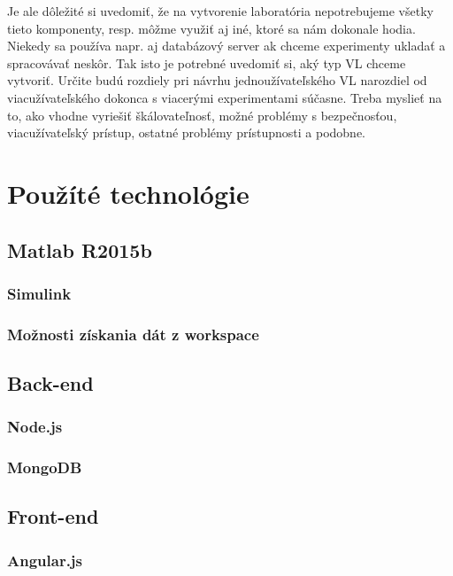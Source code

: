 Je ale dôležité si uvedomiť, že na vytvorenie laboratória nepotrebujeme všetky tieto komponenty, resp. môžme využiť aj iné, ktoré sa nám dokonale hodia. Niekedy sa používa napr. aj databázový server ak chceme experimenty ukladať a spracovávať neskôr. Tak isto je potrebné uvedomiť si, aký typ VL chceme vytvoriť. Určite budú rozdiely pri návrhu jednoužívateľského VL narozdiel od viacužívateľského dokonca s viacerými experimentami súčasne. Treba myslieť na to, ako vhodne vyriešiť škálovateľnosť, možné problémy s bezpečnosťou, viacužívateľský prístup, ostatné problémy prístupnosti a podobne.







\section{Použíté technológie}\label{used-technologies}

\subsection{Matlab R2015b}
\subsubsection{Simulink}
\subsubsection{Možnosti získania dát z workspace}

\subsection{Back-end}
\subsubsection{Node.js}
\subsubsection{MongoDB}

\subsection{Front-end}
\subsubsection{Angular.js}


